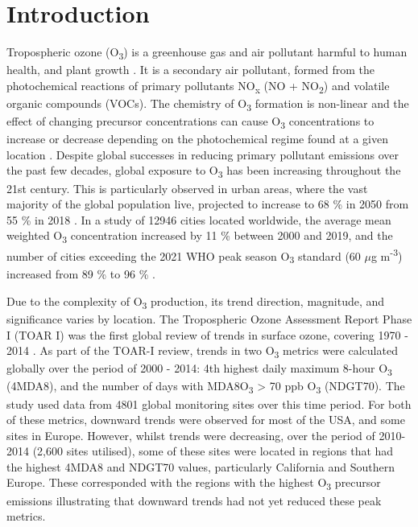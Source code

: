 \documentclass[journal abbreviation, manuscript]{copernicus}
\begin{document}
\section{Introduction}  %
Tropospheric ozone (O\textsubscript{3}) is a greenhouse gas and air pollutant harmful to human health, and plant growth \citep{fleming_2018, mills_2018, szopa_2021}. It is a secondary air pollutant, formed from the photochemical reactions of primary pollutants NO\textsubscript{x} (NO + NO\textsubscript{2}) and volatile organic compounds (VOCs). The chemistry of O\textsubscript{3} formation is non-linear and the effect of changing precursor concentrations can cause O\textsubscript{3} concentrations to increase or decrease depending on the photochemical regime found at a given location \citep{ https://doi.org/10.1029/JD095iD02p01837, SILLMAN2002339}. Despite global successes in reducing primary pollutant emissions over the past few decades, global exposure to O\textsubscript{3} has been increasing throughout the 21st century. This is particularly observed in urban areas, where the vast majority of the global population live, projected to increase to 68 \% in 2050 from 55 \% in 2018 \citep{un_2019}. In a study of 12946 cities located worldwide, the average mean weighted O\textsubscript{3} concentration increased by 11 \% between 2000 and 2019, and the number of cities exceeding the 2021 WHO peak season O\textsubscript{3} standard (60 $\mu$g m\textsuperscript{-3}) increased from 89 \% to 96 \% \citep{Malashock_2022}.

Due to the complexity of O\textsubscript{3} production, its trend direction, magnitude, and significance varies by location. The Tropospheric Ozone Assessment Report Phase I (TOAR I) was the first global review of trends in surface ozone, covering 1970 - 2014 \citep{fleming_2018, Gaudel2018}. As part of the TOAR-I review, trends in two O\textsubscript{3} metrics were calculated globally over the period of 2000 - 2014: 4th highest daily maximum 8-hour O\textsubscript{3} (4MDA8), and the number of days with MDA8O\textsubscript{3} > 70 ppb O\textsubscript{3} (NDGT70). The study used data from 4801 global monitoring sites over this time period. For both of these metrics, downward trends were observed for most of the USA, and some sites in Europe. However, whilst trends were decreasing, over the period of 2010-2014 (2,600 sites utilised), some of these sites were located in regions that had the highest 4MDA8 and NDGT70 values, particularly California and Southern Europe. These corresponded with the regions with the highest O\textsubscript{3} precursor emissions illustrating that downward trends had not yet reduced these peak metrics.
\end{document}
